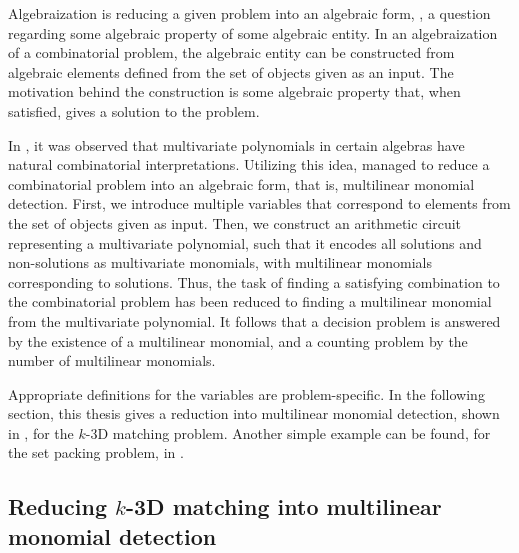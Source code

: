 
Algebraization is reducing a given problem into an algebraic form,
, a
question regarding some algebraic property of some algebraic entity. 
In an algebraization of a combinatorial problem, the algebraic entity can be constructed from algebraic elements defined from the 
set of objects given as an input. The motivation behind the construction is some algebraic property that, 
when satisfied, gives a solution to the problem.

In \cite{Valiant92}, it was observed that multivariate polynomials in certain algebras have natural combinatorial interpretations. 
Utilizing this idea, \cite{Koutis05} managed to reduce a combinatorial problem
into an algebraic form, that is, multilinear monomial detection. 
First, we introduce multiple variables that 
correspond to elements from the set of objects given as input. 
Then, we construct an arithmetic circuit representing a multivariate polynomial, such that it 
encodes all solutions and non-solutions as multivariate monomials, 
with multilinear monomials corresponding to solutions. 
Thus, the task of finding a satisfying combination to the combinatorial problem has been reduced to 
finding a multilinear monomial from the multivariate polynomial.
It follows that a decision problem is answered by 
the existence of a multilinear monomial, and a counting problem by the number of multilinear monomials.

Appropriate definitions for the variables are problem-specific. In the following section, this thesis gives a 
reduction into multilinear monomial detection, shown in \cite{KouWil15}, 
for the $k$-3D matching problem. Another simple example can be found, for the set packing problem, in \cite{Koutis05}.


\subsection{Reducing $k$-3D matching into multilinear monomial detection}
\label{sect:reduction_example}

